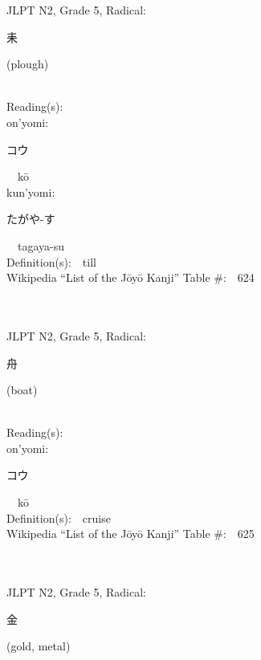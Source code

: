 \begin{multicols}{2}
{JLPT N2, Grade 5, Radical:\ \ {\begin{CJK}{UTF8}{min} 耒 \end{CJK}} (plough) } \\
Reading(s):\ \ \\
{\hspace*{1em}}on'yomi:\ \ \\
{\hspace*{2em}}{\begin{CJK}{UTF8}{min} コウ \end{CJK}}\ \ k\=o\ \ \\
{\hspace*{1em}}kun'yomi:\ \ \\
{\hspace*{2em}}{\begin{CJK}{UTF8}{min} たがや-す \end{CJK}}\ \ tagaya-su\ \ \\
Definition(s):\ \ till \\
Wikipedia ``List of the J\=oy\=o Kanji'' Table \#:\ \ 624 \\
\ \ \\
{\fontsize{34pt}{40pt}  }\ \ \\  %
{JLPT N2, Grade 5, Radical:\ \ {\begin{CJK}{UTF8}{min} 舟 \end{CJK}} (boat) } \\
Reading(s):\ \ \\
{\hspace*{1em}}on'yomi:\ \ \\
{\hspace*{2em}}{\begin{CJK}{UTF8}{min} コウ \end{CJK}}\ \ k\=o\ \ \\
Definition(s):\ \ cruise \\
Wikipedia ``List of the J\=oy\=o Kanji'' Table \#:\ \ 625 \\
\ \ \\
{\fontsize{34pt}{40pt}  }\ \ \\  %
{JLPT N2, Grade 5, Radical:\ \ {\begin{CJK}{UTF8}{min} 金 \end{CJK}} (gold, metal) } \\

\end{multicols}
